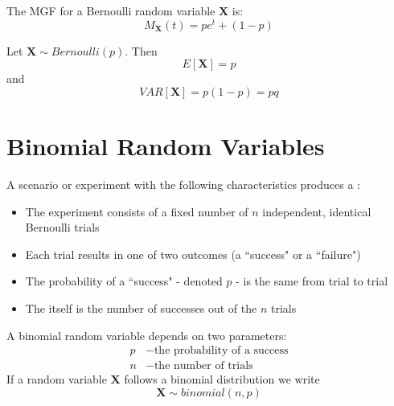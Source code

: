 \documentclass[12pt]{report}
\begin{document}
\begin{defn}{}{}
    The MGF for a Bernoulli random variable $\mathbf{X}$ is: \begin{equation*}
        M_{\mathbf{X}}(t) = pe^t+(1-p)
    \end{equation*}
\end{defn}



\begin{defn}{}{}
    Let $\mathbf{X}\sim Bernoulli(p)$. Then \begin{equation*}
        E[\mathbf{X}] = p
    \end{equation*}
    and
    \begin{equation*}
        VAR[\mathbf{X}] = p(1-p) = pq
    \end{equation*}
\end{defn}


\section{Binomial Random Variables}

\begin{defn}{}{}
    A scenario or experiment with the following characteristics produces a : \begin{itemize}
        \item The experiment consists of a fixed number of $n$ independent, identical Bernoulli trials
        \item Each trial results in one of two outcomes (a ``success" or a ``failure")
        \item The probability of a ``success" - denoted $p$ - is the same from trial to trial
        \item The  itself is the number of successes out of the $n$ trials
    \end{itemize}
\end{defn}


\begin{defn}{}{}
    A binomial random variable depends on two parameters: \begin{align*}
        p &- \text{the probability of a success} \\
        n &- \text{the number of trials}
    \end{align*}
    If a random variable $\mathbf{X}$ follows a binomial distribution we write $$\mathbf{X}\sim binomial(n,p)$$
\end{defn}
\end{document}

